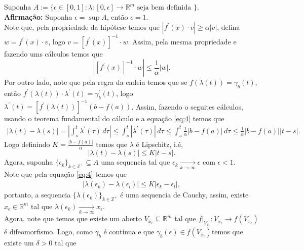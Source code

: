 \begin{homeworkProblem}[Seção 1-9]
\begin{solution}
    Suponha $A:=\{\epsilon\in [0,1]: \lambda:[0,\epsilon]\to\mathbb{R}^{m}\text{ seja bem definida }\}$.\\
    \textbf{Afirmação:} Suponha $\epsilon=\sup A$, então $\epsilon=1$.\\
      Note que, pela propriedade da hipótese temos que $|f^{\prime}(x)\cdot v|\geq \alpha |v|$, defina $w=f^{\prime}(x)\cdot v$, logo $v=\left[ f^{\prime}(x) \right]^{-1}\cdot w$. Assim, pela mesma propriedade e fazendo ums cálculos temos que 
      \begin{equation}\label{eq:4}
        \left| \left[ f^{\prime}(x) \right]^{-1}\cdot w \right|\leq \frac{1}{\alpha}\left| w \right|. 
      \end{equation}
      Por outro lado, note que pela regra da cadeia temos que se $f(\lambda(t))=\gamma_b(t)$, então $f^{\prime}(\lambda(t))\cdot \lambda^{\prime}(t)=\gamma_b^{\prime}(t)$, logo $\lambda^{\prime}(t)=\left[ f^{\prime}(\lambda(t)) \right]^{-1}\left( b-f(a) \right)$. Assim, fazendo o seguites cálculos, usando o teorema fundamental do cálculo e a equação \eqref{eq:4} temos que
      \begin{align*}
        \left| \lambda(t)-\lambda(s) \right|=\left| \int_{s}^{t}\lambda^{\prime}(\tau)\,d\tau \right|\leq \int_{s}^{t}\left| \lambda^{\prime}(\tau) \right|\,d\tau\leq \int_{s}^{t}\frac{1}{\alpha}\left| b-f(a) \right|\,d\tau\leq \frac{1}{\alpha}\left| b-f(a) \right|\left| t-s \right|.
      \end{align*}
      Logo definindo $K=\frac{|b-f(a)|}{\alpha}$ temos que $\lambda$ é Lipschitz, i.é, 
      \begin{equation}\label{eq:5}
        \left| \lambda(t)-\lambda(s) \right|\leq K\left| t-s \right|.
      \end{equation}
      Agora, suponha $\{\epsilon_k\}_{k\in\mathbb{Z}^{+}}\subseteq A$ uma sequencia tal que $\epsilon_k\xrightarrow[k\to\infty]{}\epsilon$ com $\epsilon<1$.\\
      Note que pela equação \eqref{eq:4} temos que
      \begin{align*}
        |\lambda(\epsilon_{k})-\lambda(\epsilon_{l})|\leq K\left| \epsilon_{k}-\epsilon_{l} \right|,
      \end{align*}
      portanto, a sequencia $\{\lambda(\epsilon_{k})\}_{k\in\mathbb{Z}^{+}}$ é uma sequencia de Cauchy, assim, existe $x_{\epsilon}\in\mathbb{R}^{m}$ tal que $\lambda(\epsilon_{k})\xrightarrow[k\to\infty]{}x_{\epsilon}$.\\
      Agora, note que temos que existe um aberto $V_{x_{\epsilon}}\subseteq \mathbb{R}^{m}$ tal que $f\big|_{V_{x_{\epsilon}}}:V_{x_{\epsilon}}\to f\left( V_{x_{\epsilon}} \right)$ é difeomorfismo. Logo,  como $\gamma_{b}$ é contínua e que $\gamma_{b}(\epsilon)\in f\left( V_{x_{\epsilon}} \right)$temos que existe um $\delta>0$ tal que

\end{solution}
\end{homeworkProblem}
